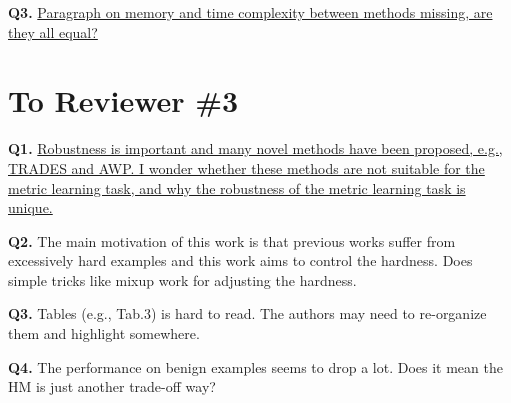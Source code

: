 \documentclass[10pt,twocolumn,letterpaper]{article}
\begin{document}
\noindent\textbf{Q3.}
%
\ul{
Paragraph on memory and time complexity between methods missing, are they all
equal?
}

\section{To Reviewer \#3}

\noindent\textbf{Q1.}
%
\ul{
Robustness is important and many novel methods have been proposed, e.g., TRADES and AWP. I wonder whether these methods are not suitable for the metric learning task, and why the robustness of the metric learning task is unique.
}

\noindent\textbf{Q2.}
%
The main motivation of this work is that previous works suffer from excessively hard examples and this work aims to control the hardness. Does simple tricks like mixup work for adjusting the hardness.

\noindent\textbf{Q3.}
%
Tables (e.g., Tab.3) is hard to read. The authors may need to re-organize them and highlight somewhere.

\noindent\textbf{Q4.}
%
The performance on benign examples seems to drop a lot. Does it mean the HM is just another trade-off way?

{\small


}
\end{document}
